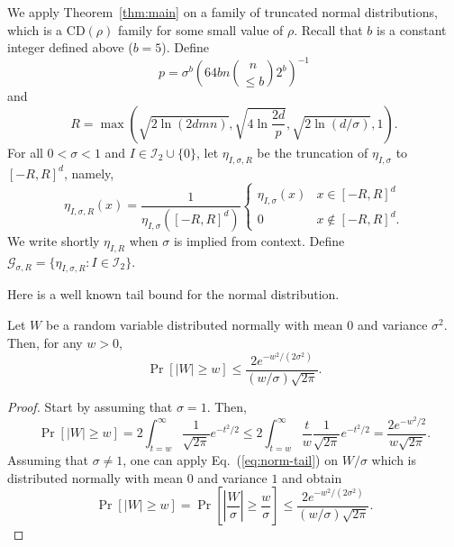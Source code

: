\documentclass[final, 12pt]{colt2018}
\providecommand{\CD}{\mathrm{CD}}
\renewcommand{\eqref}[1]{Eq.~(\ref{#1})}
\begin{document}
We apply Theorem~\ref{thm:main} on a family of truncated normal distributions, which is a $\CD(\rho)$ family for some small value of $\rho$. Recall that $b$ is a constant integer defined above ($b=5$).
Define 
\begin{equation} \label{eq:defp}
p =\sigma^b\left( 64 b n \binom{n}{\le b} 2^b \right)^{-1}
\end{equation}
and
\begin{equation} \label{eq:R-def}
R=\max \left(\sqrt{2 \ln (2 d m n)}, \sqrt{4 \ln \frac{2d}{p}}, \sqrt{2 \ln (d/\sigma)}, 1 \right).
\end{equation}
For all $0 < \sigma < 1$ and $I \in \mathcal{I}_2 \cup \{0\}$, let $\eta_{I,\sigma,R}$ be the truncation of $\eta_{I,\sigma}$ to $[-R,R]^d$, namely,
\[
\eta_{I,\sigma,R}(x)
= \frac{1}{\eta_{I,\sigma}\left( [-R,R]^d \right)} \begin{cases}
\eta_{I,\sigma}(x) & x \in [-R,R]^d \\
0 & x \notin [-R,R]^d.
\end{cases}
\]
We write shortly $\eta_{I,R}$ when $\sigma$ is implied from context. Define $\mathcal{G}_{\sigma,R} = \{ \eta_{I,\sigma,R} \colon{I \in \mathcal{I}_2}\}$.

Here is a well known tail bound for the normal distribution.
\begin{proposition} \label{prop:norm-tail}
Let $W$ be a random variable distributed normally with mean $0$ and variance $\sigma^2$. Then,
for any $w > 0$,
\begin{equation} \label{eq:norm-tail}
\Pr[\lvert W \rvert \ge w]
\le \frac{2e^{-w^2/(2\sigma^2)}}{(w/\sigma) \sqrt{2 \pi}}.
\end{equation}
\end{proposition}

\begin{proof}
Start by assuming that $\sigma = 1$. Then,
\begin{equation*}
\Pr[\lvert W \rvert \ge w]
= 2 \int_{t = w}^\infty \frac{1}{\sqrt{2 \pi}} e^{-t^2/2} 
\le 2\int_{t = w}^\infty \frac{t}{w} \frac{1}{\sqrt{2 \pi}} e^{-t^2/2} 
= \frac{2 e^{-w^2/2}}{w \sqrt{2 \pi}}.
\end{equation*}
Assuming that $\sigma \ne 1$, one can apply \eqref{eq:norm-tail} on $W/\sigma$ which is distributed normally with mean $0$ and variance $1$ and obtain
\[
\Pr[\lvert W \rvert \ge w]
= \Pr\left[\left\lvert \frac{W}{\sigma}\right\rvert \ge \frac{w}{\sigma}\right]
\le \frac{2e^{-w^2/(2\sigma^2)}}{(w/\sigma) \sqrt{2 \pi}}.
\]
\end{proof}
\end{document}
